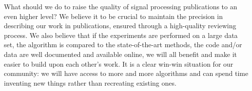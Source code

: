 What should we do to raise the quality of signal processing publications to an even higher level? We believe it to be crucial to maintain the precision in describing our work in publications, ensured through a high-quality reviewing process. We also believe that if the experiments are performed on a large data set, the algorithm is compared to the state-of-the-art methods, the code and/or data are well documented and available online, we will all benefit and make it easier to build upon each other's work. It is a clear win-win situation for our community: we will have access to more and more algorithms and can spend time inventing new things rather than recreating existing ones.
